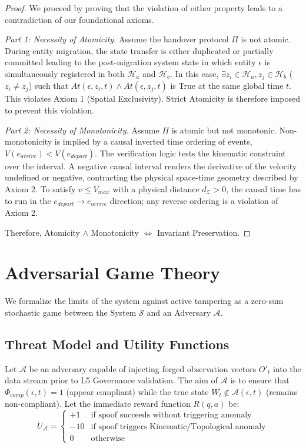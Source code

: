 \documentclass[conference]{IEEEtran}
\newcommand{\Z}{\mathcal{Z}} %
\newcommand{\Sstate}{\mathcal{S}} %
\newcommand{\Auth}{\mathcal{A}} %
\begin{document}
\begin{proof}
We proceed by proving that the violation of either property leads to a contradiction of our foundational axioms.

\textit{Part 1: Necessity of Atomicity.} 
Assume the handover protocol $\Pi$ is not atomic. During entity migration, the state transfer is either duplicated or partially committed leading to the post-migration system state in which entity $\epsilon$ is simultaneously registered in both $\mathcal{H}_a$ and $\mathcal{H}_b$. In this case, $\exists z_i \in \mathcal{H}_a, z_j \in \mathcal{H}_b$ ($z_i \neq z_j$) such that $At(\epsilon, z_i, t) \land At(\epsilon, z_j, t)$ is True at the same global time $t$. This violates Axiom 1 (Spatial Exclusivity). Strict Atomicity is therefore imposed to prevent this violation.

\textit{Part 2: Necessity of Monotonicity.}
Assume $\Pi$ is atomic but not monotonic. Non-monotonicity is implied by a causal inverted time ordering of events, $V(e_{arrive}) < V(e_{depart})$. The verification logic tests the kinematic constraint over the interval. A negative causal interval renders the derivative of the velocity undefined or negative, contracting the physical space-time geometry described by Axiom 2. To satisfy $v \le V_{max}$ with a physical distance $d_\Z > 0$, the causal time has to run in the $e_{depart} \to e_{arrive}$ direction; any reverse ordering is a violation of Axiom 2. 

Therefore, Atomicity $\land$ Monotonicity $\iff$ Invariant Preservation.
\end{proof}

\section{Adversarial Game Theory}

We formalize the limits of the system against active tampering as a zero-sum stochastic game between the System $\Sstate$ and an Adversary $\mathcal{A}$.

\subsection{Threat Model and Utility Functions}
Let $\mathcal{A}$ be an adversary capable of injecting forged observation vectors $O'_{t}$ into the data stream prior to L5 Governance validation. The aim of $\mathcal{A}$ is to ensure that $\Phi_{comp}(\epsilon, t) = 1$ (appear compliant) while the true state $W_t \notin \Auth(\epsilon, t)$ (remains non-compliant). Let the immediate reward function $R(q, a)$ be:
\begin{equation}
U_\mathcal{A} = \begin{cases} 
+1 & \text{if spoof succeeds without triggering anomaly} \\
-10 & \text{if spoof triggers Kinematic/Topological anomaly} \\
0 & \text{otherwise} 
\end{cases}
\end{equation}
\end{document}
